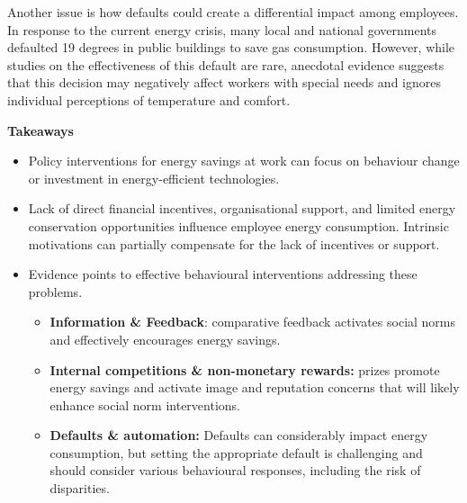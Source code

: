 \documentclass[
  11pt,
  captions=heading]{scrreport}
\begin{document}
Another issue is how defaults could create a differential impact among
employees. In response to the current energy crisis, many local and
national governments defaulted 19 degrees in public buildings to save
gas consumption. However, while studies on the effectiveness of this
default are rare, anecdotal evidence suggests that this decision may
negatively affect workers with special needs and ignores individual
perceptions of temperature and comfort.

\textbf{Takeaways}

\begin{itemize}
\item
  Policy interventions for energy savings at work can focus on behaviour
  change or investment in energy-efficient technologies.
\item
  Lack of direct financial incentives, organisational support, and
  limited energy conservation opportunities influence employee energy
  consumption. Intrinsic motivations can partially compensate for the
  lack of incentives or support.
\item
  Evidence points to effective behavioural interventions addressing
  these problems.

  \begin{itemize}
  \item
    \textbf{Information \& Feedback}: comparative feedback activates
    social norms and effectively encourages energy savings.
  \item
    \textbf{Internal competitions \& non-monetary rewards:} prizes
    promote energy savings and activate image and reputation concerns
    that will likely enhance social norm interventions.
  \item
    \textbf{Defaults \& automation:} Defaults can considerably impact
    energy consumption, but setting the appropriate default is
    challenging and should consider various behavioural responses,
    including the risk of disparities.
  \end{itemize}
\end{itemize}
\end{document}

